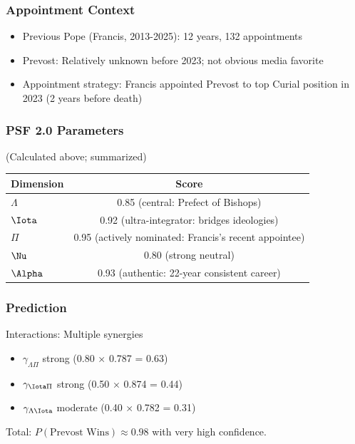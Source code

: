 \documentclass[11pt]{article}
\begin{document}
\subsubsection{Appointment Context}

\begin{itemize}
\item Previous Pope (Francis, 2013-2025): 12 years, 132 appointments
\item Prevost: Relatively unknown before 2023; not obvious media favorite
\item Appointment strategy: Francis appointed Prevost to top Curial position in 2023 (2 years before death)
\end{itemize}

\subsubsection{PSF 2.0 Parameters}

(Calculated above; summarized)

\begin{table}[h]
\centering
\begin{tabular}{|l|c|}
\hline
Dimension & Score \\
\hline
$\Lambda$ & 0.85 (central: Prefect of Bishops) \\
$\Iota$ & 0.92 (ultra-integrator: bridges ideologies) \\
$\Pi$ & 0.95 (actively nominated: Francis's recent appointee) \\
$\Nu$ & 0.80 (strong neutral) \\
$\Alpha$ & 0.93 (authentic: 22-year consistent career) \\
\hline
\end{tabular}
\end{table}

\subsubsection{Prediction}

Interactions: Multiple synergies
\begin{itemize}
\item $\gamma_{\Lambda\Pi}$ strong (0.80 × 0.787 = 0.63)
\item $\gamma_{\Iota\Pi}$ strong (0.50 × 0.874 = 0.44)
\item $\gamma_{\Lambda\Iota}$ moderate (0.40 × 0.782 = 0.31)
\end{itemize}

Total: $P(\text{Prevost Wins}) \approx 0.98$ with very high confidence.
\end{document}
